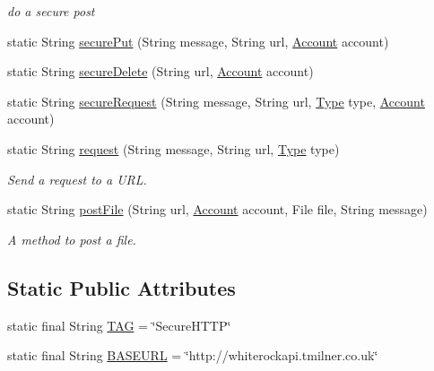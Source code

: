 \begin{DoxyCompactItemize}
\begin{DoxyCompactList}\small\item\em do a secure post \end{DoxyCompactList}\item 
static String \hyperlink{classuk_1_1ac_1_1swan_1_1digitaltrails_1_1utils_1_1_h_t_t_p_aa5005a61c1b439529061b948ad4050ab}{secure\+Put} (String message, String url, \hyperlink{classuk_1_1ac_1_1swan_1_1digitaltrails_1_1components_1_1_account}{Account} account)
\item 
static String \hyperlink{classuk_1_1ac_1_1swan_1_1digitaltrails_1_1utils_1_1_h_t_t_p_aa9e748404d6dc70642b9dd6a7ef188a0}{secure\+Delete} (String url, \hyperlink{classuk_1_1ac_1_1swan_1_1digitaltrails_1_1components_1_1_account}{Account} account)
\item 
static String \hyperlink{classuk_1_1ac_1_1swan_1_1digitaltrails_1_1utils_1_1_h_t_t_p_aa0274af3adb019f5a332b2a1e6c561ef}{secure\+Request} (String message, String url, \hyperlink{enumuk_1_1ac_1_1swan_1_1digitaltrails_1_1utils_1_1_h_t_t_p_1_1_type}{Type} type, \hyperlink{classuk_1_1ac_1_1swan_1_1digitaltrails_1_1components_1_1_account}{Account} account)
\item 
static String \hyperlink{classuk_1_1ac_1_1swan_1_1digitaltrails_1_1utils_1_1_h_t_t_p_a79f0ab16505475a762da051a74c24af0}{request} (String message, String url, \hyperlink{enumuk_1_1ac_1_1swan_1_1digitaltrails_1_1utils_1_1_h_t_t_p_1_1_type}{Type} type)
\begin{DoxyCompactList}\small\item\em Send a request to a U\+R\+L. \end{DoxyCompactList}\item 
static String \hyperlink{classuk_1_1ac_1_1swan_1_1digitaltrails_1_1utils_1_1_h_t_t_p_af00ca465041f1c84bd7a59a077a61b8f}{post\+File} (String url, \hyperlink{classuk_1_1ac_1_1swan_1_1digitaltrails_1_1components_1_1_account}{Account} account, File file, String message)
\begin{DoxyCompactList}\small\item\em A method to post a file. \end{DoxyCompactList}\end{DoxyCompactItemize}
\subsection*{Static Public Attributes}
\begin{DoxyCompactItemize}
\item 
static final String \hyperlink{classuk_1_1ac_1_1swan_1_1digitaltrails_1_1utils_1_1_h_t_t_p_af0ea53de9d06c95f912175c13ecb89ba}{T\+A\+G} = \char`\"{}Secure\+H\+T\+T\+P\char`\"{}
\item 
static final String \hyperlink{classuk_1_1ac_1_1swan_1_1digitaltrails_1_1utils_1_1_h_t_t_p_adc7390074ee303b7a69c94c5e1fb0356}{B\+A\+S\+E\+U\+R\+L} = \char`\"{}http\+://whiterockapi.\+tmilner.\+co.\+uk\char`\"{}
\end{DoxyCompactItemize}
